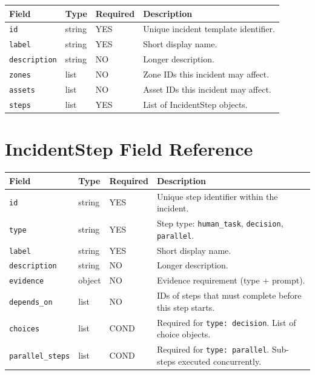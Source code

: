 \begin{center}
\small
\begin{tabular}{lllp{5.5cm}}
\textbf{Field} & \textbf{Type} & \textbf{Required} & \textbf{Description} \\
\hline
\texttt{id} & string & YES & Unique incident template identifier. \\
\texttt{label} & string & YES & Short display name. \\
\texttt{description} & string & NO & Longer description. \\
\texttt{zones} & list & NO & Zone IDs this incident may affect. \\
\texttt{assets} & list & NO & Asset IDs this incident may affect. \\
\texttt{steps} & list & YES & List of IncidentStep objects. \\
\end{tabular}
\end{center}

\section{IncidentStep Field Reference}
\label{sec:ref-incident-step-fields}

\begin{center}
\small
\begin{tabular}{lllp{5.5cm}}
\textbf{Field} & \textbf{Type} & \textbf{Required} & \textbf{Description} \\
\hline
\texttt{id} & string & YES & Unique step identifier within the incident. \\
\texttt{type} & string & YES & Step type: \texttt{human\_task}, \texttt{decision}, \texttt{parallel}. \\
\texttt{label} & string & YES & Short display name. \\
\texttt{description} & string & NO & Longer description. \\
\texttt{evidence} & object & NO & Evidence requirement (type + prompt). \\
\texttt{depends\_on} & list & NO & IDs of steps that must complete before this step starts. \\
\texttt{choices} & list & COND & Required for \texttt{type: decision}. List of choice objects. \\
\texttt{parallel\_steps} & list & COND & Required for \texttt{type: parallel}. Sub-steps executed concurrently. \\
\end{tabular}
\end{center}

